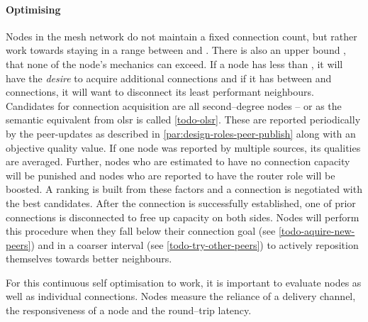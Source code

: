 \paragraph{Optimising}

Nodes in the mesh network do not maintain a fixed connection count, but rather work towards staying in a range between \minConnectionGoal and \maxConnectionGoal. There is also an upper bound \maxConnections, that none of the node's mechanics can exceed. If a node has less than \minConnectionGoal, it will have the \textit{desire} to acquire additional connections and if it has between \maxConnectionGoal and \maxConnections connections, it will want to disconnect its least performant neighbours. Candidates for connection acquisition are all second–degree nodes – or  as the semantic equivalent from \gls{olsr} is called \ref{todo-olsr}. These are reported periodically by the \glspl{peer-update} as described in \ref{par:design-roles-peer-publish} along with an objective quality value. If one node was reported by multiple sources, its qualities are averaged. Further, nodes who are estimated to have no connection capacity will be punished and nodes who are reported to have the router role will be boosted. A ranking is built from these factors and a connection is negotiated with the best candidates. After the connection is successfully established, one of prior connections is disconnected to free up capacity on both sides.
Nodes will perform this procedure when they fall below their connection goal \minConnectionGoal (see \ref{todo-aquire-new-peers}) and in a coarser interval (see \ref{todo-try-other-peers}) to actively reposition themselves towards better neighbours.

For this continuous self optimisation to work, it is important to evaluate nodes as well as individual connections. Nodes measure the reliance of a delivery channel, the responsiveness of a node and the round–trip latency.
